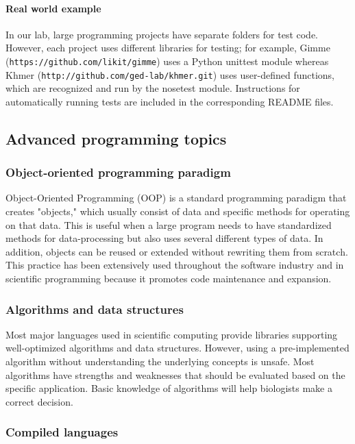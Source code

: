 \documentclass[ChapterTOCs,krantz2]{krantz} %
\begin{document}
\paragraph{Real world example}

In our lab,
large programming projects have separate folders for test code. However, each project uses
different libraries for testing; for example, Gimme
(\texttt{https://github.com/likit/gimme}) uses a Python unittest module whereas Khmer
(\texttt{http://github.com/ged-lab/khmer.git}) uses user-defined functions, which are
recognized and run by the nosetest module. Instructions for automatically
running tests are included in the corresponding README
files.

\subsection{Advanced programming topics}

\subsubsection{Object-oriented programming paradigm}

Object-Oriented Programming (OOP) is a standard programming paradigm that
creates "objects," which usually consist of data 
and specific methods for operating on that data. This is useful when a large program 
needs to have standardized methods for data-processing but also uses 
several different types of data.
In addition, objects can be reused or extended without rewriting them from scratch.
This practice has been extensively used throughout the software industry and 
in scientific programming because it promotes code maintenance and expansion.

\subsubsection{Algorithms and data structures}

Most major languages used in
scientific computing provide libraries supporting well-optimized algorithms and
data structures. However, using a
pre-implemented algorithm without understanding the underlying concepts is
unsafe. Most algorithms have strengths and weaknesses that should be 
evaluated based on the specific application. Basic knowledge of algorithms 
will help biologists make a correct decision.

\subsubsection{Compiled languages}
\end{document}

